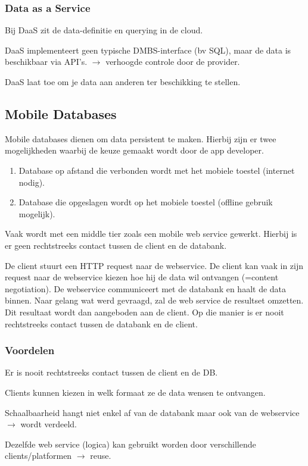 \documentclass[a4paper,12pt]{article}
\begin{document}
\subsubsection{Data as a Service}
Bij DaaS zit de data-definitie en querying in de cloud.

DaaS implementeert geen typische DMBS-interface (bv SQL), maar de data is beschikbaar via API's. $\rightarrow$ verhoogde controle door de provider.

DaaS laat toe om je data aan anderen ter beschikking te stellen.

\subsection{Mobile Databases}
Mobile databases dienen om data persistent te maken.
Hierbij zijn er twee mogelijkheden waarbij de keuze gemaakt wordt door de app developer.
\begin{enumerate}
\item Database op afstand die verbonden wordt met het mobiele toestel (internet nodig).
\item Database die opgeslagen wordt op het mobiele toestel (offline gebruik mogelijk).
\end{enumerate}

Vaak wordt met een middle tier zoals een mobile web service gewerkt.
Hierbij is er geen rechtstreeks contact tussen de client en de databank.

De client stuurt een HTTP request naar de webservice.
De client kan vaak in zijn request naar de webservice kiezen hoe hij de data wil ontvangen (=content negotiation).
De webservice communiceert met de databank en haalt de data binnen.
Naar gelang wat werd gevraagd, zal de web service de resultset omzetten.
Dit resultaat wordt dan aangeboden aan de client.
Op die manier is er nooit rechtstreeks contact tussen de databank en de client.

\subsubsection{Voordelen}
Er is nooit rechtstreeks contact tussen de client en de DB.

Clients kunnen kiezen in welk formaat ze de data wensen te ontvangen.

Schaalbaarheid hangt niet enkel af van de databank maar ook van de webservice $\rightarrow$ wordt verdeeld.

Dezelfde web service (logica) kan gebruikt worden door verschillende clients/platformen $\rightarrow$ reuse.
\end{document}
